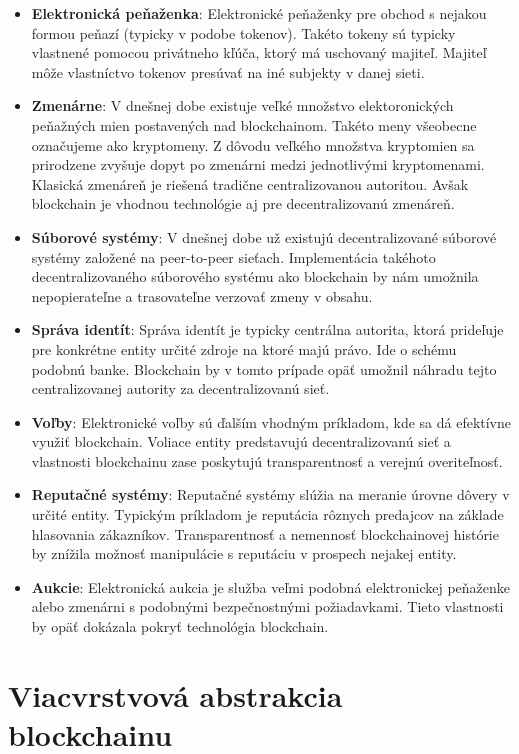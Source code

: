 \begin{itemize}
	\item \textbf{Elektronická peňaženka}: Elektronické peňaženky pre obchod s nejakou formou peňazí (typicky v podobe tokenov). Takéto tokeny sú typicky vlastnené pomocou privátneho kľúča, ktorý má uschovaný majiteľ. Majiteľ môže vlastníctvo tokenov presúvať na iné subjekty v danej sieti.
	\item \textbf{Zmenárne}: V dnešnej dobe existuje veľké množstvo elektoronických peňažných mien postavených nad blockchainom. Takéto meny všeobecne označujeme ako kryptomeny. Z dôvodu veľkého množstva kryptomien sa prirodzene zvyšuje dopyt po zmenárni medzi jednotlivými kryptomenami. Klasická zmenáreň je riešená tradične centralizovanou autoritou. Avšak blockchain je vhodnou technológie aj pre decentralizovanú zmenáreň.
	\item \textbf{Súborové systémy}: V dnešnej dobe už existujú decentralizované súborové systémy založené na peer-to-peer sieťach. Implementácia takéhoto decentralizovaného súborového systému ako blockchain by nám umožnila nepopierateľne a trasovateľne verzovať zmeny v obsahu.
	\item \textbf{Správa identít}: Správa identít je typicky centrálna autorita, ktorá prideľuje pre konkrétne entity určité zdroje na ktoré majú právo. Ide o schému podobnú banke. Blockchain by v tomto prípade opäť umožnil náhradu tejto centralizovanej autority za decentralizovanú sieť.
	\item \textbf{Voľby}: Elektronické voľby sú ďalším vhodným príkladom, kde sa dá efektívne využiť blockchain. Voliace entity predstavujú decentralizovanú sieť a vlastnosti blockchainu zase poskytujú transparentnosť a verejnú overiteľnosť.
	\item \textbf{Reputačné systémy}: Reputačné systémy slúžia na meranie úrovne dôvery v určité entity. Typickým príkladom je reputácia rôznych predajcov na základe hlasovania zákazníkov. Transparentnosť a nemennosť blockchainovej histórie by znížila možnosť manipulácie s reputáciu v prospech nejakej entity.
	\item \textbf{Aukcie}: Elektronická aukcia je služba veľmi podobná elektronickej peňaženke alebo zmenárni s podobnými bezpečnostnými požiadavkami. Tieto vlastnosti by opäť dokázala pokryť technológia blockchain.
\end{itemize}

\section{Viacvrstvová abstrakcia blockchainu}

